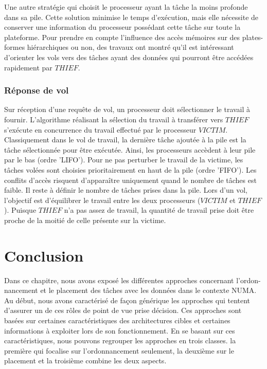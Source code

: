 Une autre stratégie qui choisit le processeur ayant la tâche la moins profonde dans sa pile.  
Cette solution minimise le temps d’exécution, mais elle nécessite de conserver une information du processeur possédant cette tâche sur toute la plateforme.
Pour prendre en compte l’influence des accès mémoires sur des plates-formes hiérarchiques ou non, des travaux ont montré qu’il est intéressant d’orienter les vols vers des tâches ayant des données qui pourront être accédées rapidement par $THIEF$. \cite{quint11}
%
\subsubsection{Réponse de vol}
%
Sur réception d’une requête de vol, un processeur doit sélectionner le travail à fournir.
L’algorithme réalisant la sélection du travail à transférer vers $THIEF$ s’exécute en concurrence du travail effectué par le processeur $VICTIM$. 
Classiquement dans le vol de travail, la dernière tâche ajoutée à la pile est la tâche sélectionnée pour être exécutée.
Ainsi, les processeurs accèdent à leur pile par le bas (ordre 'LIFO'). 
Pour ne pas perturber le travail de la victime, les tâches volées sont choisies prioritairement en haut de la pile (ordre 'FIFO'). 
Les conflits d’accès risquent d’apparaître uniquement quand le nombre de tâches est faible. 
Il reste à définir le nombre de tâches prises dans la pile. 
Lors d’un vol, l’objectif est d’équilibrer le travail entre les deux processeurs ($VICTIM$ et $THIEF$). 
Puisque $THIEF$ n’a pas assez de travail, la quantité de travail prise doit être proche de la moitié de celle présente sur la victime. 
\newpage
\section{Conclusion}\label{concEdA}
%
Dans ce chapitre, nous avons exposé les différentes approches concernant l'ordon-nancement et le placement des tâches avec les données dans le contexte NUMA. 
Au début, nous avons caractérisé de façon générique les approches qui tentent d'assurer un de ces rôles de point de vue prise décision. Ces approches sont basées sur  certaines caractéristiques des architectures cibles et certaines informations à exploiter lors de son fonctionnement. En se basant sur ces caractéristiques, nous pouvons regrouper les approches en trois classes. la première qui focalise sur l'ordonnancement seulement, la deuxième sur le placement et la troisième combine les deux aspects.

